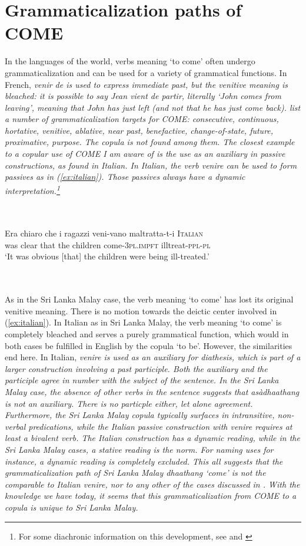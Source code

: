 \documentclass[a4paper,12pt]{article}
\newcommand{\xbox}[2]{\noindent\parbox[t]{#1}{#2}\noindent}
\newcommand{\xref}[1]{(\ref{#1})}
\newcommand{\trs}[2]{{\em #1\em} `#2'}
\newcommand{\ea}{\\\\}
\newcommand{\z}{\\\\}
\begin{document}
\section{Grammaticalization paths of COME}\label{sec:targets}
In the languages of the world, verbs meaning `to come' often undergo grammaticalization and can be used for a variety of grammatical functions. In French, \em venir de \em is used to express immediate past, but the venitive meaning is bleached: it is possible to say \em Jean vient de partir\em, literally `John comes from leaving', meaning that John has just left (and not that he has just come back). \citet[68--78]{HeineEtAl2002} list a number of grammaticalization targets for COME: consecutive, continuous, hortative, venitive, ablative, near past, benefactive, change-of-state, future, proximative, purpose. The copula is not found among them. The closest example to a copular use of COME I am aware of is the use as an auxiliary in passive constructions, as found in Italian. In Italian, the verb \em venire \em  can be used to form passives as in \xref{ex:italian}. Those passives always have a dynamic interpretation.\footnote{For some diachronic information on this development, see \citet{Michaelis1997venire} and \citet{Giacalone2000venire}}


\xbox{\textwidth}{
\ea\label{ex:italian}
\gll Era chiaro che i ragazzi veni-vano maltratta-t-i \textsc{Italian} \\
     was clear that the children come-\textsc{3pl.impft} illtreat-\textsc{ppl}-\textsc{pl}  \\
    `It was obvious [that] the children were being ill-treated.' \citep[282]{MaidenEtAl2000}
\z
} \\

As in the Sri Lanka Malay case, the verb meaning `to come' has lost its original venitive meaning. There is no motion towards the deictic center involved in \xref{ex:italian}. In Italian as in Sri Lanka Malay, the verb meaning `to come' is completely bleached and serves a purely grammatical function, which would in both cases be fulfilled in English by the copula `to be'. However, the similarities end here. In Italian, \em venire \em is used as an auxiliary for diathesis, which is part of a larger construction involving a past participle. Both the auxiliary and the participle agree in number with the subject of the sentence. In the Sri Lanka Malay case, the absence of other verbs in the sentence suggests that  \em asàdhaathang \em is not an auxiliary. There is no particple either, let alone agreement.  Furthermore, the Sri Lanka Malay copula typically surfaces in intransitive, non-verbal predications, while the Italian passive construction with \em venire \em requires at least a bivalent verb. The Italian construction has a dynamic reading, while in the Sri Lanka Malay cases, a stative reading is the norm. For naming uses for instance, a dynamic reading is completely excluded. This all suggests that the grammaticalization path of Sri Lanka Malay \trs{dhaathang}{come} is not the comparable to  Italian \em venire\em, nor to any other of the cases discussed in \citet{HeineEtAl2002}. With the knowledge we have today, it seems that this grammaticalization from COME to a copula is unique to Sri Lanka Malay.
\end{document}
